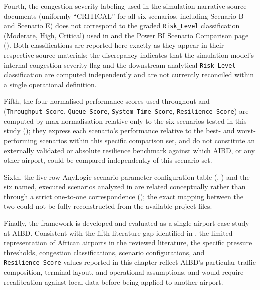 Fourth, the congestion-severity labeling used in the simulation-narrative source documents (uniformly ``CRITICAL'' for all six scenarios, including Scenario B and Scenario E) does not correspond to the graded \nolinkurl{Risk_Level} classification (Moderate, High, Critical) used in  and the Power BI Scenario Comparison page (). Both classifications are reported here exactly as they appear in their respective source materials; the discrepancy indicates that the simulation model’s internal congestion-severity flag and the downstream analytical \nolinkurl{Risk_Level} classification are computed independently and are not currently reconciled within a single operational definition.

Fifth, the four normalised performance scores used throughout  and  (\nolinkurl{Throughput_Score}, \nolinkurl{Queue_Score}, \nolinkurl{System_Time_Score}, \nolinkurl{Resilience_Score}) are computed by max-normalisation relative only to the six scenarios tested in this study (); they express each scenario’s performance relative to the best- and worst-performing scenarios within this specific comparison set, and do not constitute an externally validated or absolute resilience benchmark against which AIBD, or any other airport, could be compared independently of this scenario set.

Sixth, the five-row AnyLogic scenario-parameter configuration table (, ) and the six named, executed scenarios analyzed in  are related conceptually rather than through a strict one-to-one correspondence (); the exact mapping between the two could not be fully reconstructed from the available project files.

Finally, the framework is developed and evaluated as a single-airport case study at AIBD. Consistent with the fifth literature gap identified in , the limited representation of African airports in the reviewed literature, the specific pressure thresholds, congestion classifications, scenario configurations, and \nolinkurl{Resilience_Score} values reported in this chapter reflect AIBD’s particular traffic composition, terminal layout, and operational assumptions, and would require recalibration against local data before being applied to another airport.